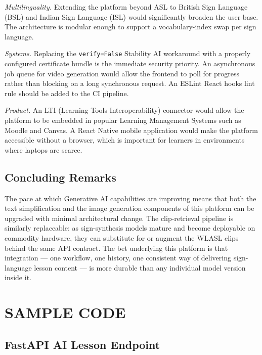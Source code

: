 \documentclass[12pt,a4paper,oneside]{report}
\begin{document}
\textit{Multilinguality.} Extending the platform beyond ASL to British Sign Language (BSL) and Indian Sign Language (ISL) would significantly broaden the user base. The architecture is modular enough to support a vocabulary-index swap per sign language.

\textit{Systems.} Replacing the \texttt{verify=False} Stability AI workaround with a properly configured certificate bundle is the immediate security priority. An asynchronous job queue for video generation would allow the frontend to poll for progress rather than blocking on a long synchronous request. An ESLint React hooks lint rule should be added to the CI pipeline.

\textit{Product.} An LTI (Learning Tools Interoperability) connector would allow the platform to be embedded in popular Learning Management Systems such as Moodle and Canvas. A React Native mobile application would make the platform accessible without a browser, which is important for learners in environments where laptops are scarce.

\section{Concluding Remarks}

The pace at which Generative AI capabilities are improving means that both the text simplification and the image generation components of this platform can be upgraded with minimal architectural change. The clip-retrieval pipeline is similarly replaceable: as sign-synthesis models mature and become deployable on commodity hardware, they can substitute for or augment the WLASL clips behind the same API contract. The bet underlying this platform is that integration --- one workflow, one history, one consistent way of delivering sign-language lesson content --- is more durable than any individual model version inside it.

\appendix

\chapter{SAMPLE CODE}

\section{FastAPI AI Lesson Endpoint}
\end{document}
